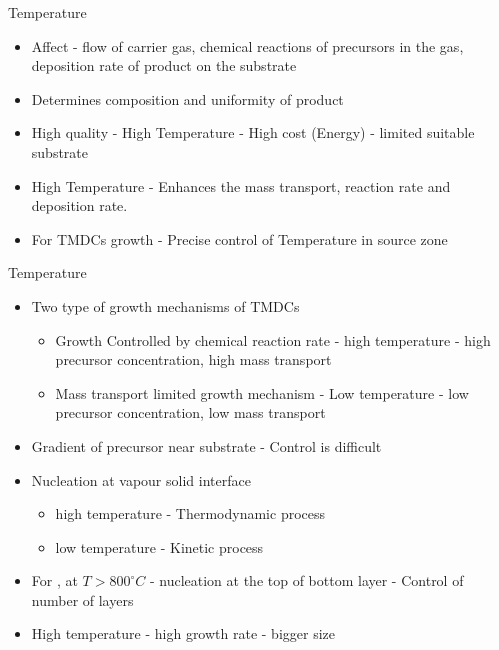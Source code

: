 \documentclass{beamer}
\begin{document}
\begin{frame}{Temperature}
    \begin{itemize}
        \item Affect - flow of carrier gas, chemical reactions of precursors in the gas, deposition rate of product on the substrate
        \item Determines composition and uniformity of product
        \item High quality - High Temperature - High cost (Energy) - limited suitable substrate
        \item High Temperature - Enhances the mass transport, reaction rate and deposition rate.
        \item For TMDCs growth - Precise control of Temperature in source zone
    \end{itemize}
\end{frame}

\begin{frame}{Temperature}
    \begin{itemize}
        \item Two type of growth mechanisms of TMDCs
        \begin{itemize}
            \item Growth Controlled by chemical reaction rate - high temperature - high precursor concentration, high mass transport
            \item Mass transport limited growth mechanism - Low temperature - low precursor concentration, low mass transport
        \end{itemize}
        \item Gradient of precursor near substrate - Control is difficult
        \item Nucleation at vapour solid interface
        \begin{itemize}
            \item high temperature - Thermodynamic process
            \item low temperature - Kinetic process
        \end{itemize}
        \item For , at $T > 800^{\circ}C$ - nucleation at the top of bottom layer - Control of number of layers
        \item High temperature - high growth rate - bigger size
    \end{itemize}
\end{frame}
\end{document}
